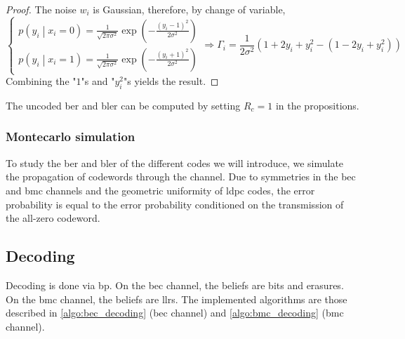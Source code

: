 \begin{proof}
    The noise $w_i$ is Gaussian, therefore, by change of variable,
    \begin{equation}
        \begin{cases}
            p\left(y_i \middle| x_i = 0 \right) = \frac{1}{\sqrt{2 \pi \sigma^2}}\exp\left(-\frac{(y_i - 1)^2}{2 \sigma^2}\right) \\
            p\left(y_i \middle| x_i = 1 \right) = \frac{1}{\sqrt{2 \pi \sigma^2}}\exp\left(-\frac{(y_i + 1)^2}{2 \sigma^2}\right)
        \end{cases}
        \Rightarrow \Gamma_i = \frac{1}{2 \sigma^2} \left(1 + 2 y_i + y_i^2 - (1 - 2 y_i + y_i ^2)\right)
    \end{equation}
    Combining the "$1$"s and "$y_i^2$"s yields the result.
\end{proof}

The uncoded \acrshort{ber} and \acrshort{bler} can be computed by setting $R_c =
    1$ in the propositions.

\subsubsection{Montecarlo simulation}
To study the \acrlong{ber} and \acrlong{bler} of the different codes we will
introduce, we simulate the propagation of codewords through the channel. Due to
symmetries in the \acrshort{bec} and \acrshort{bmc} channels and the geometric
uniformity of \acrshort{ldpc} codes, the error probability is equal to the error
probability conditioned on the transmission of the all-zero codeword.


\subsection{Decoding}
Decoding is done via \acrfull{bp}. On the \acrshort{bec} channel, the beliefs
are bits and erasures. On the \acrshort{bmc} channel, the beliefs are
\acrlong{llr}s. The implemented algorithms are those described in
\autoref{algo:bec_decoding} (\acrshort{bec} channel) and
\autoref{algo:bmc_decoding} (\acrshort{bmc} channel).


